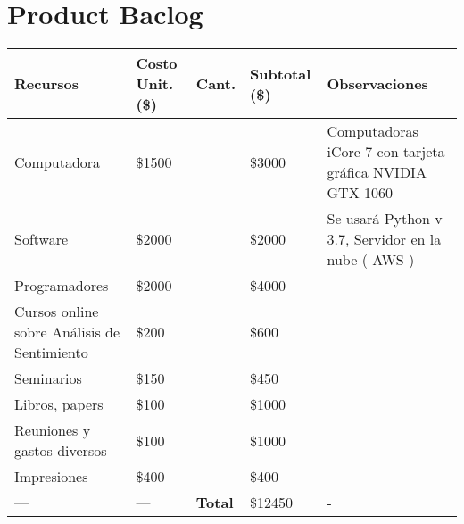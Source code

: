\chapter{Product Baclog}



\begin{tabular}{ |p{4.25cm}|p{1.5cm}|p{1cm}|p{1.5cm}|p{5cm}| }
	\hline
	\rowcolor{gray!40}  \textbf{Recursos}         & \textbf{Costo Unit.(\$)}      & \textbf{Cant.} & \textbf{Subtotal (\$)} & \textbf{Observaciones}   \\  \hline
	Computadora                        & \raggedleft \$1500  &\centering 2  &\raggedleft \$3000  &  Computadoras iCore 7 con tarjeta gr\'afica NVIDIA GTX 1060    \\   \hline
	Software                        & \raggedleft \$2000  &\centering 1  &\raggedleft \$2000  &  Se usar\'a Python v 3.7, Servidor en la nube ( AWS )    \\   \hline
	Programadores              & \raggedleft \$2000    & \centering 2  &\raggedleft \$4000   & \\   \hline
	Cursos online sobre An\'alisis de Sentimiento              &\raggedleft  \$200    &\centering 3  &\raggedleft  \$600   & \\   \hline
	Seminarios              & \raggedleft \$150    & \centering 3  &\raggedleft \$450   & \\   \hline
	Libros, papers              & \raggedleft \$100    & \centering 10  &\raggedleft \$1000   & \\   \hline
	Reuniones y gastos diversos              & \raggedleft \$100    & \centering 10  &\raggedleft \$1000   & \\   \hline
	Impresiones              & \raggedleft \$400    & \centering 1  &\raggedleft \$400   & \\   \hline
	\centering          ---           &   \centering   --- & \cellcolor{gray!40} \textbf{Total}   &\raggedleft \$12450   &  -  \\   \hline
\end{tabular}